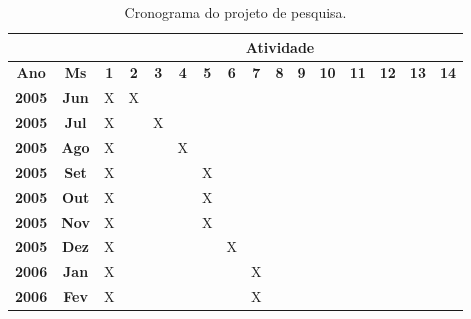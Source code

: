 \documentclass[a4paper,titlepage,12pt]{article}
\begin{document}
\begin{table}[ht]
\caption{Cronograma do projeto de pesquisa.} \label{tab:cronograma}
  \begin{center}
    \begin{tabular}{|c|c||c|c|c|c|c|c|c|c|c|c|c|c|c|c|} \hline
                       & & \multicolumn{14}{c|}{ {\bf Atividade } } \\\hline \hline
      {\bf Ano}  &{\bf Ms}  &{\bf 1}  &{\bf 2}  &{\bf 3} &{\bf 4}  &{\bf 5}  &{\bf 6}  &{\bf 7} &{\bf 8}  &{\bf 9}  &{\bf 10} &{\bf 11}  &{\bf 12}  &{\bf 13}  &{\bf 14}\\\hline
      {\bf 2005} &{\bf Jun}  & X       & X       &        &         &         &         &        &         &         &         &          &          &          &        \\\hline
      {\bf 2005} &{\bf Jul}  & X       &         & X      &         &         &         &        &         &         &         &          &          &          &        \\\hline
      {\bf 2005} &{\bf Ago}  & X       &         &        & X       &         &         &        &         &         &         &          &          &          &        \\\hline
      {\bf 2005} &{\bf Set}  & X       &         &        &         & X       &         &        &         &         &         &          &          &          &        \\\hline
      {\bf 2005} &{\bf Out}  & X       &         &        &         & X       &         &        &         &         &         &          &          &          &        \\\hline
      {\bf 2005} &{\bf Nov}  & X       &         &        &         & X       &         &        &         &         &         &          &          &          &        \\\hline
      {\bf 2005} &{\bf Dez}  & X       &         &        &         &         & X       &        &         &         &         &          &          &          &        \\\hline
      {\bf 2006} &{\bf Jan}  & X       &         &        &         &         &         & X      &         &         &         &          &          &          &        \\\hline
      {\bf 2006} &{\bf Fev}  & X       &         &        &         &         &         & X      &         &         &         &          &          &          &        \\\hline

\end{tabular}
\end{center}
\end{table}
\end{document}
